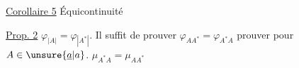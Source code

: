\uline{Corollaire 5} Équicontinuité 

\uline{Prop. 2} $\varphi_{|A|}=\varphi_{|A^*|}$.
Il suffit de  prouver  $\varphi_{AA^*}=\varphi_{A^*A}$
 prouver pour $A\in\unsure{\underline a|a}$.
$\mu_{A^*A}=\mu_{AA^*}$
